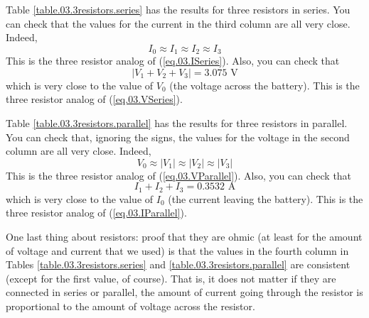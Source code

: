Table \ref{table.03.3resistors.series} has the results for three resistors in series. You can check that the values for the current in the third column are all very close. Indeed,
\begin{equation}
	I_{0} \approx I_{1} \approx I_{2} \approx I_{3}
\end{equation}
This is the three resistor analog of (\ref{eq.03.ISeries}). Also, you can check that
\begin{equation}
	| V_{1} + V_{2} + V_{3} | = 3.075 \text{ V}
\end{equation}
which is very close to the value of $V_{0}$ (the voltage across the battery). This is the three resistor analog of (\ref{eq.03.VSeries}).

Table \ref{table.03.3resistors.parallel} has the results for three resistors in parallel. You can check that, ignoring the signs, the values for the voltage in the second column are all very close. Indeed,
\begin{equation}
	V_{0} \approx |V_{1}| \approx |V_{2}| \approx |V_{3}|
\end{equation}
This is the three resistor analog of (\ref{eq.03.VParallel}). Also, you can check that
\begin{equation}
	I_{1} + I_{2} + I_{3}  = 0.3532 \text{ A}
\end{equation}
which is very close to the value of $I_{0}$ (the current leaving the battery). This is the three resistor analog of (\ref{eq.03.IParallel}).

One last thing about resistors: proof that they are ohmic (at least for the amount of voltage and current that we used) is that the values in the fourth column in Tables \ref{table.03.3resistors.series} and \ref{table.03.3resistors.parallel} are consistent (except for the first value, of course). That is, it does not matter if they are connected in series or parallel, the amount of current going through the resistor is proportional to the amount of voltage across the resistor.

